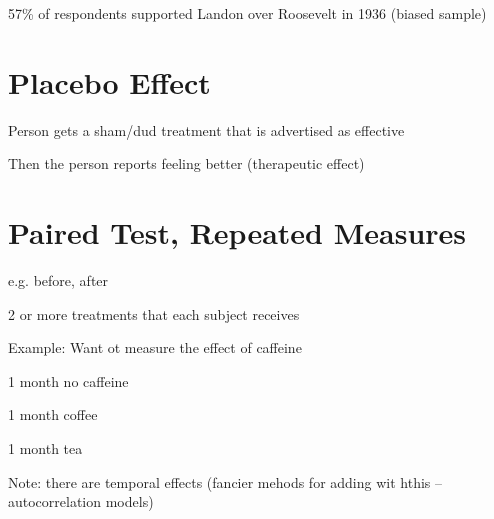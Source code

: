 \documentclass[twoside]{article}
\newtheorem{definition}[theorem]{Definition}
\begin{document}
57\% of respondents supported Landon over Roosevelt in 1936 (biased sample) 

\section{Placebo Effect}

Person gets a sham/dud treatment that is advertised as effective

Then the person reports feeling better (therapeutic effect)

\section{Paired Test, Repeated Measures}

e.g. before, after

2 or more treatments that each subject receives

Example: Want ot measure the effect of caffeine

1 month no caffeine

1 month coffee

1 month tea

Note: there are temporal effects (fancier mehods for adding wit hthis -- autocorrelation models)

%
%

\end{document}
